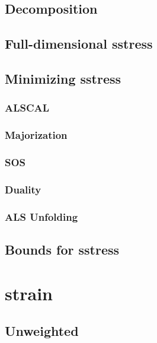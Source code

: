 \documentclass[
  12pt,
]{book}
\begin{document}
\subsection{Decomposition}\label{decomposition}

\subsection{Full-dimensional sstress}\label{full-dimensional-sstress}

\subsection{Minimizing sstress}\label{minimizing-sstress}

\subsubsection{ALSCAL}\label{alscal}

\subsubsection{Majorization}\label{majorization}

\subsubsection{SOS}\label{sos}

\subsubsection{Duality}\label{duality}

\subsubsection{ALS Unfolding}\label{alsunfold}

\subsection{Bounds for sstress}\label{bounds-for-sstress}

\section{strain}\label{strain}

\subsection{Unweighted}\label{unweighted}
\end{document}

